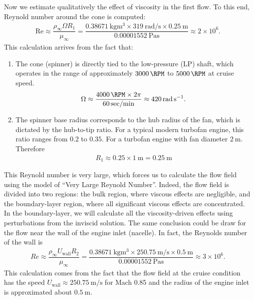 \documentclass[12pt]{book}
\theoremstyle{bfnote}
\theoremstyle{bfnote}
\begin{document}
Now we estimate qualitatively the effect of viscosity in the first flow. To this end, Reynold number around the cone is computed:
\begin{align}
    \mathrm{Re} \approx \dfrac{\rho_{\infty} \Omega R_1}{\mu_{\infty}} = \dfrac{\SI{0.38671}{\kilogram\cubic\meter} \times \SI{319}{\radian\per\second} \times \SI{0.25}{\meter}}{\SI{0.00001552}{\pascal\second}} \approx 2 \times 10^6.
\end{align}
This calculation arrives from the fact that:
\begin{enumerate}
    \item The cone (spinner) is directly tied to the low-pressure (LP) shaft, which operates in the range of approximately $\SI{3000}{\RPM}$ to $\SI{5000}{\RPM}$ at cruise speed.
    \begin{align*}
        \Omega \approx \dfrac{\SI{4000}{\RPM} \times 2 \pi}{\SI{60}{\sec\per\min}} \approx \SI{420}{\radian\per\second}.
    \end{align*}
    \item The spinner base radius corresponds to the hub radius of the fan, which is dictated by the hub-to-tip ratio. For a typical modern turbofan engine, this ratio ranges from $0.2$ to $0.35$. For a turbofan engine with fan diameter $\SI{2}{\meter}$. Therefore
    \begin{align*}
        R_1 \approx 0.25 \times \SI{1}{\meter} = \SI{0.25}{\meter}
    \end{align*}
\end{enumerate}

This Reynold number is very large, which forces us to calculate the flow field using the model of \enquote{Very Large Reynold Number}. Indeed, the flow field is divided into two regions: the bulk region, where viscous effects are negligible, and the boundary-layer region, where all significant viscous effects are concentrated. In the boundary-layer, we will calculate all the viscosity-driven effects using perturbations from the inviscid solution. The same conclusion could be draw for the flow near the wall of the engine inlet (nacelle). In fact, the Reynolds number of the wall is
\begin{align*}
    Re \approx \dfrac{\rho_\infty U_{\text{wall}} R_2}{\mu_\infty} = \dfrac{\SI{0.38671}{\kilogram\cubic\meter} \times \SI{250.75}{\meter\per\second} \times \SI{0.5}{\meter}}{\SI{0.00001552}{\pascal\second}} \approx 3 \times 10^6.
\end{align*}
This calculation comes from the fact that the flow field at the cruise condition has the speed $U_{\text{wall}} \approx \SI{250.75}{\meter\per\second}$ for Mach 0.85 and the radius of the engine inlet is approximated about $\SI{0.5}{\meter}$.
\end{document}
